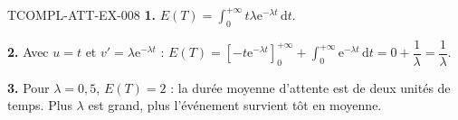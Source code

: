 \begin{corrige}{TCOMPL-ATT-EX-008}
\textbf{1.} $E(T)=\displaystyle\int_0^{+\infty}t\lambda\mathrm{e}^{-\lambda t}
\,\mathrm{d}t$.

\textbf{2.} Avec $u=t$ et $v'=\lambda\mathrm{e}^{-\lambda t}$ :
$E(T)=\left[-t\mathrm{e}^{-\lambda t}\right]_0^{+\infty}
+\int_0^{+\infty}\mathrm{e}^{-\lambda t}\,\mathrm{d}t
=0+\dfrac{1}{\lambda}=\dfrac{1}{\lambda}$.

\textbf{3.} Pour $\lambda=0{,}5$, $E(T)=2$ : la durée moyenne d'attente est de
deux unités de temps. Plus $\lambda$ est grand, plus l'événement survient
tôt en moyenne.
\end{corrige}
